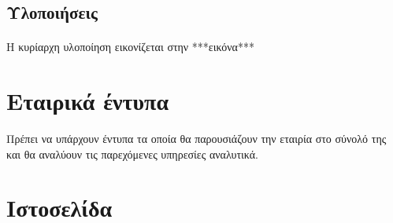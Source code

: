 \documentclass[a4paper, 12pt, twoside]{report}
\begin{document}
		\subsection{Υλοποιήσεις}
			\paragraph{}{Η κυρίαρχη υλοποίηση εικονίζεται στην ***εικόνα***
			}
	
		\section{Εταιρικά έντυπα}{Πρέπει να υπάρχουν έντυπα τα οποία θα παρουσιάζουν την εταιρία στο σύνολό της και θα αναλύουν τις παρεχόμενες υπηρεσίες αναλυτικά.  
		}
		
		
		\section{Ιστοσελίδα}
	
\end{document}
